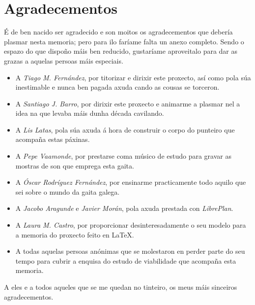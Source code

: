 \thispagestyle{empty}
\section*{Agradecementos}

É de ben nacido ser agradecido e son moitos os agradecementos que debería
plasmar nesta memoria; pero para ilo faríame falta un anexo completo. Sendo o
espazo do que dispoño máis ben reducido, gustaríame aproveitalo para dar as
grazas a aquelas persoas máis especiais.

\begin{itemize}
 \item A \textit{Tiago M. Fernández}, por titorizar e dirixir este proxecto,
       así como pola súa inestimable e nunca ben pagada axuda cando as cousas
       se torceron.
 \item A \textit{Santiago J. Barro}, por dirixir este proxecto e animarme a
       plasmar nel a idea na que levaba máis dunha década cavilando.
 \item A \textit{Lis Latas}, pola súa axuda á hora de construir o corpo do
       punteiro que acompaña estas páxinas.
 \item A \textit{Pepe Vaamonde}, por prestarse coma músico de estudo para
       gravar as mostras de son que emprega esta gaita.
 \item A \textit{Óscar Rodríguez Fernández}, por ensinarme practicamente todo
       aquilo que sei sobre o mundo da gaita galega.
 \item A \textit{Jacobo Aragunde} e \textit{Javier Morán}, pola axuda prestada
       con \textit{LibrePlan}.
 \item A \textit{Laura M. Castro}, por proporcionar desinteresadamente o seu
       modelo para a memoria do proxecto feito en \LaTeX.
 \item A todas aquelas persoas anónimas que se molestaron en perder parte do
       seu tempo para cubrir a enquisa do estudo de viabilidade que acompaña
       esta memoria.
\end{itemize}

A eles e a todos aqueles que se me quedan no tinteiro, os meus máis sinceiros
agradecementos.
